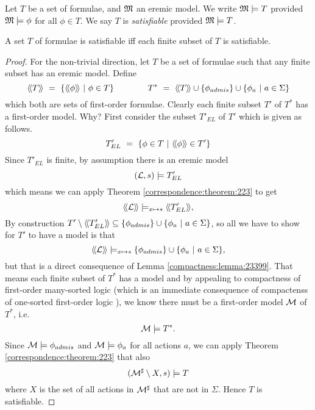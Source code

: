 \begin{definition}
Let $T$ be a set of \ELABR{} formulae, and $\frak{M}$ an eremic model.  We
write $\frak{M} \models T$ provided $\frak{M} \models \phi$ for all $\phi \in
T$.  We say $T$ is \emph{satisfiable} provided $\frak{M} \models T$.
\end{definition}

\begin{theorem}
A set $T$ of \ELABR{} formulae is satisfiable iff each finite subset of
$T$ is satisfiable.
\end{theorem}
\begin{proof}
For the non-trivial direction, let $T$ be a set of \ELABR{} formulae
such that any finite subset has an eremic model. Define 
\[
  \SEMBTWO{T} 
     \ =\ 
  \{\SEMBTWO{\phi}\ |\ \phi \in T\} 
     \qquad\qquad
  T^*
     \ =\ 
  \SEMBTWO{T} \cup \{\phi_{admis}\} \cup \{ \phi_a\ |\ a \in \Sigma\}
\]
which both are sets of first-order formulae. Clearly each finite subset $T'$ of 
$T^*$ has a first-order model. Why? First consider the subset $T'_{EL}$ of $T'$
which is given as follows.
\[
   T'_{EL} \ =\ \{ \phi \in T\ |\ \langle\!\langle \phi \rangle\!\rangle \in T' \}
\]
Since $T'_{EL}$ is finite, by assumption there is an eremic model 
\[
   (\mathcal{L}, s) \models T'_{EL}
\]
which means we can apply Theorem \ref{correspondence:theorem:223} to get
\[
   \langle\!\langle \mathcal{L} \rangle\!\rangle \models_{x \mapsto s} \langle\!\langle T'_{EL} \rangle\!\rangle,
\]
By construction $T' \setminus \langle\!\langle T'_{EL} \rangle\!\rangle \subseteq
\{\phi_{admis}\} \cup \{ \phi_a\ |\ a \in \Sigma\}$, so all we have to
show for $T'$ to have a model is that
\[
    \langle\!\langle \mathcal{L} \rangle\!\rangle \models_{x \mapsto s} \{\phi_{admis}\} \cup \{ \phi_a\ |\ a \in \Sigma\},
\]
but that is a direct consequence of Lemma
\ref{compactness:lemma:23399}.  That
means each finite subset of $T^*$ has a model and by appealing to
compactness of first-order many-sorted logic (which is an immediate
consequence of compactenss of one-sorted first-order logic
\cite{EndertonHB:matinttl}), we know there must be a first-order model
$\mathcal{M}$ of $T^*$, i.e.
\[
   \mathcal{M} \models T^*.
\]
Since $\mathcal{M} \models \phi_{admis}$ and $\mathcal{M} \models \phi_a$ for all actions $a$, 
we can apply Theorem \ref{correspondence:theorem:223} that also
\[
   (\mathcal{M}^{\sharp} \setminus X, s) \models T
\]
where $X$ is the set of all actions in $\mathcal{M}^{\sharp}$ that are not
in $\Sigma$. Hence $T$ is satisfiable.
 
\end{proof}





